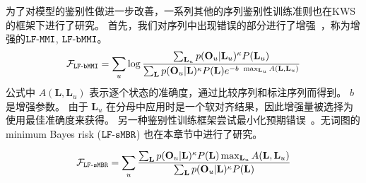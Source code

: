 为了对模型的鉴别性做进一步改善，一系列其他的序列鉴别性训练准则也在KWS的框架下进行了研究。 
首先，我们对序列中出现错误的部分进行了增强~\cite{povey2008boosted}，称为增强的$\tt{ LF\text{-}MMI}$, $\tt{ LF\text{-}bMMI}$。
\begin{equation}
\label{equ:kws-bmmi}
\begin{split}
\mathcal{F}_{\tt{LF\text{-}bMMI}}
=\sum_{u} \log \frac {\sum_{\mathbf{L}_u} p(\mathbf{O}_u|\mathbf{L}_u)^{\kappa}P(\mathbf{L}_u)}{\sum_{\mathbf{L}} p(\mathbf{O}_u|\mathbf{L})^{\kappa}P(\mathbf{L})e^{-b\ \mathop{\max}_{\mathbf{L}_u} A(\mathbf{L},\mathbf{L}_u)}}  
\end{split}
\end{equation}
公式中 $A(\mathbf{L},\mathbf{L}_u)$ 表示逐个状态的准确度，通过比较序列和标注序列而得到。
$b$ 是增强参数。
由于 $\mathbf{L}_u$ 在分母中应用时是一个软对齐结果，因此增强量被选择为使用最佳准确度来获得。
另一种鉴别性训练框架尝试最小化预期错误~\cite{gibson2006hypothesis}。无词图的minimum
Bayes risk ($\tt{LF\text{-}sMBR}$) 也在本章节中进行了研究。

\begin{equation}
\label{equ:kws-smbr}
\begin{split}
\mathcal{F}_{\tt{LF\text{-}sMBR}}
=\sum_{u}  \frac {\sum_{\mathbf{L}} p(\mathbf{O}_u|\mathbf{L})^{\kappa}P(\mathbf{L})\mathop{\max}_{\mathbf{L}_u} A(\mathbf{L},\mathbf{L}_u)}{\sum_{\mathbf{L}} p(\mathbf{O}_u|\mathbf{L})^{\kappa}P(\mathbf{L})}  
\end{split}
\end{equation}


